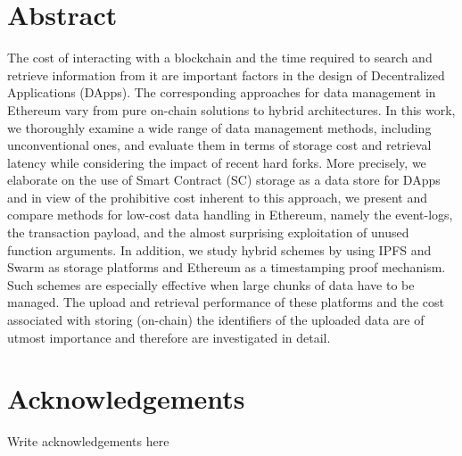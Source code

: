 


 



\chapter*{Abstract}
 
 The cost of interacting with a blockchain and the time required to search and retrieve information from it are important factors in the design of Decentralized Applications (DApps). The corresponding approaches for data management in Ethereum vary from pure on-chain solutions to hybrid architectures. In this work, we thoroughly examine a wide range of data management methods, including unconventional ones, and evaluate them in terms of storage cost and retrieval latency while considering the impact of recent hard forks. More precisely, we elaborate on the use of Smart Contract (SC) storage as a data store for DApps and in view of the prohibitive cost inherent to this approach, we present and compare methods for low-cost data handling in Ethereum, namely the event-logs, the transaction payload, and the almost surprising exploitation of unused function arguments. In addition, we study hybrid schemes by using IPFS and Swarm as storage platforms and Ethereum as a timestamping proof mechanism. Such schemes are especially effective when large chunks of data have to be managed. The upload and retrieval performance of these platforms and the cost associated with storing (on-chain) the identifiers of the uploaded data are of utmost importance and therefore are investigated in detail.
 
 \cleardoublepage



\chapter*{Acknowledgements}

Write acknowledgements here

 \cleardoublepage


